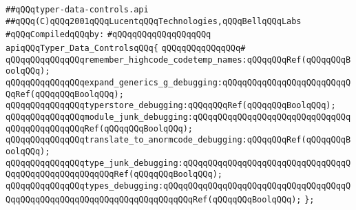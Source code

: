 \label{src/lib/compiler/front/typer-stuff/main/typer-data-controls.api}
\verb|##qQQqtyper-data-controls.api|\newline
\verb|##qQQq(C)qQQq2001qQQqLucentqQQqTechnologies,qQQqBellqQQqLabs|\newline
\newline
\verb|#qQQqCompiledqQQqby:|\newline
\verb|#qQQqqQQqqQQqqQQqqQQq|\newline
\newline
\verb|apiqQQqTyper_Data_ControlsqQQq{|\newline
\verb|qQQqqQQqqQQqqQQq#|\newline
\verb|qQQqqQQqqQQqqQQqremember_highcode_codetemp_names:qQQqqQQqRef(qQQqqQQqBoolqQQq);|\newline
\verb|qQQqqQQqqQQqqQQqexpand_generics_g_debugging:qQQqqQQqqQQqqQQqqQQqqQQqqQQqRef(qQQqqQQqBoolqQQq);|\newline
\verb|qQQqqQQqqQQqqQQqtyperstore_debugging:qQQqqQQqRef(qQQqqQQqBoolqQQq);|\newline
\verb|qQQqqQQqqQQqqQQqmodule_junk_debugging:qQQqqQQqqQQqqQQqqQQqqQQqqQQqqQQqqQQqqQQqqQQqqQQqRef(qQQqqQQqBoolqQQq);|\newline
\verb|qQQqqQQqqQQqqQQqtranslate_to_anormcode_debugging:qQQqqQQqRef(qQQqqQQqBoolqQQq);|\newline
\verb|qQQqqQQqqQQqqQQqtype_junk_debugging:qQQqqQQqqQQqqQQqqQQqqQQqqQQqqQQqqQQqqQQqqQQqqQQqqQQqqQQqRef(qQQqqQQqBoolqQQq);|\newline
\verb|qQQqqQQqqQQqqQQqtypes_debugging:qQQqqQQqqQQqqQQqqQQqqQQqqQQqqQQqqQQqqQQqqQQqqQQqqQQqqQQqqQQqqQQqqQQqqQQqqQQqRef(qQQqqQQqBoolqQQq);|\newline
\verb|};|\newline
\newline
\newline

